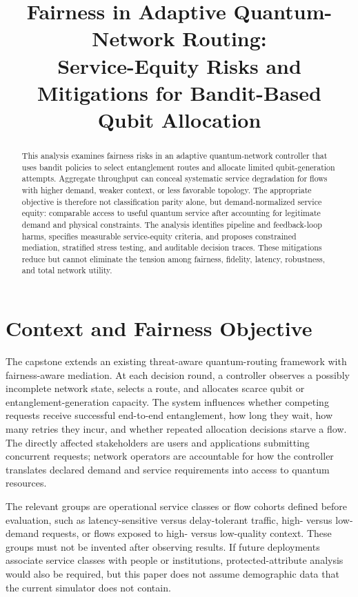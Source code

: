 \documentclass[10pt,conference]{IEEEtran}
\title{Fairness in Adaptive Quantum-Network Routing:\\
Service-Equity Risks and Mitigations for Bandit-Based Qubit Allocation}
\author{\IEEEauthorblockN{Piter Z. Garcia Bautista}
\IEEEauthorblockA{DSCI 602: Applied Data Science II\\
Capstone: Fairness-Aware Adaptive Routing for Quantum Networks\\
Chosen Focus Area: Fairness}}
\begin{document}
\maketitle

\begin{abstract}
This analysis examines fairness risks in an adaptive quantum-network controller that uses bandit policies to select entanglement routes and allocate limited qubit-generation attempts. Aggregate throughput can conceal systematic service degradation for flows with higher demand, weaker context, or less favorable topology. The appropriate objective is therefore not classification parity alone, but demand-normalized service equity: comparable access to useful quantum service after accounting for legitimate demand and physical constraints. The analysis identifies pipeline and feedback-loop harms, specifies measurable service-equity criteria, and proposes constrained mediation, stratified stress testing, and auditable decision traces. These mitigations reduce but cannot eliminate the tension among fairness, fidelity, latency, robustness, and total network utility.
\end{abstract}

\section{Context and Fairness Objective}

The capstone extends an existing threat-aware quantum-routing framework with fairness-aware mediation. At each decision round, a controller observes a possibly incomplete network state, selects a route, and allocates scarce qubit or entanglement-generation capacity. The system influences whether competing requests receive successful end-to-end entanglement, how long they wait, how many retries they incur, and whether repeated allocation decisions starve a flow. The directly affected stakeholders are users and applications submitting concurrent requests; network operators are accountable for how the controller translates declared demand and service requirements into access to quantum resources.

The relevant groups are operational service classes or flow cohorts defined before evaluation, such as latency-sensitive versus delay-tolerant traffic, high- versus low-demand requests, or flows exposed to high- versus low-quality context. These groups must not be invented after observing results. If future deployments associate service classes with people or institutions, protected-attribute analysis would also be required, but this paper does not assume demographic data that the current simulator does not contain.
\end{document}
